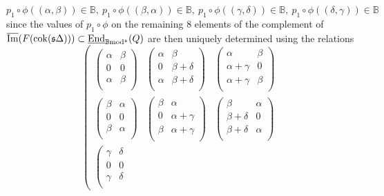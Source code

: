 \documentclass[12pt]{article}
\def\Endi{{\underline{\rm End}}}
\def\scoker{{\rm cok}}
\def\B{{\mathbb B}}
\def\imm{\overline{\rm Im}}
\def\yb{\mathfrak{s}}
\def\b2{{\rm \B mod^{\mathfrak s}}}
\begin{document}
 $$
 p_1\circ \phi((\alpha ,\beta ))\in \B,\  p_1\circ \phi((\beta ,\alpha ))\in \B,\ p_1\circ \phi((\gamma ,\delta ))\in \B,\ p_1\circ \phi((\delta ,\gamma ))\in \B $$
 since the values of $p_1\circ \phi$ on the remaining $8$ elements of the complement of $\imm(F(\scoker(\yb\Delta)))\subset \Endi_\b2(Q)$ are then uniquely determined using the relations 
 $$
 \left(
\begin{array}{ccc}
 \left(
\begin{array}{cc}
 \alpha  & \beta  \\
 0 & 0 \\
 \alpha  & \beta  \\
\end{array}
\right) & \left(
\begin{array}{cc}
 \alpha  & \beta  \\
 0 & \beta +\delta  \\
 \alpha  & \beta +\delta  \\
\end{array}
\right) & \left(
\begin{array}{cc}
 \alpha  & \beta  \\
 \alpha +\gamma  & 0 \\
 \alpha +\gamma  & \beta  \\
\end{array}
\right) \\
 \left(
\begin{array}{cc}
 \beta  & \alpha  \\
 0 & 0 \\
 \beta  & \alpha  \\
\end{array}
\right) & \left(
\begin{array}{cc}
 \beta  & \alpha  \\
 0 & \alpha +\gamma  \\
 \beta  & \alpha +\gamma  \\
\end{array}
\right) & \left(
\begin{array}{cc}
 \beta  & \alpha  \\
 \beta +\delta  & 0 \\
 \beta +\delta  & \alpha  \\
\end{array}
\right) \\
 \left(
\begin{array}{cc}
 \gamma  & \delta  \\
 0 & 0 \\
 \gamma  & \delta  \\

\end{array}
\end{array}$$
\end{document}
